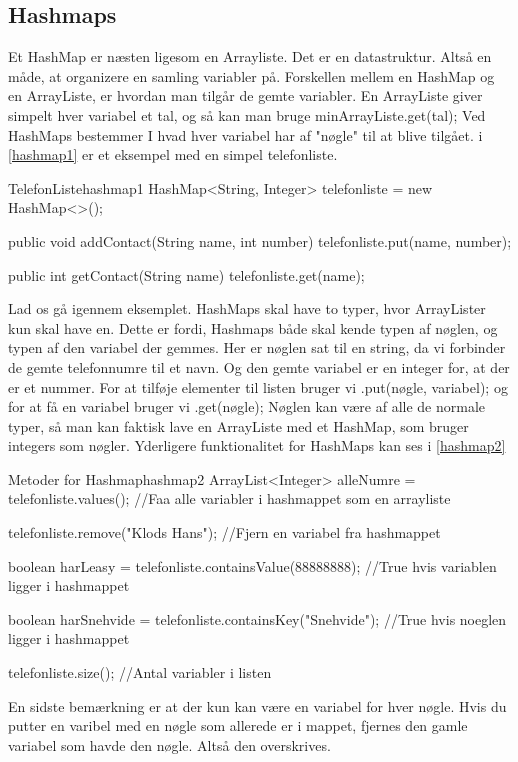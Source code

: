 \subsection{Hashmaps}
Et HashMap er næsten ligesom en Arrayliste. Det er en datastruktur. Altså en måde, at organizere en samling variabler på. Forskellen mellem en HashMap og en ArrayListe, er hvordan man tilgår de gemte variabler. En ArrayListe giver simpelt hver variabel et tal, og så kan man bruge minArrayListe.get(tal); Ved HashMaps bestemmer I hvad hver variabel har af "nøgle" til at blive tilgået. i \autoref{hashmap1} er et eksempel med en simpel telefonliste.
\begin{JavaCode}{TelefonListe}{hashmap1}
	HashMap<String, Integer> telefonliste = new HashMap<>();
	
	public void addContact(String name, int number){
		telefonliste.put(name, number);
	}
	
	public int getContact(String name){
		telefonliste.get(name);	
	}
\end{JavaCode}
Lad os gå igennem eksemplet. HashMaps skal have to typer, hvor ArrayLister kun skal have en. Dette er fordi, Hashmaps både skal kende typen af nøglen, og typen af den variabel der gemmes. Her er nøglen sat til en string, da vi forbinder de gemte telefonnumre til et navn. Og den gemte variabel er en integer for, at  der er et nummer.  For at tilføje elementer til listen bruger vi .put(nøgle, variabel); og for at få en variabel bruger vi .get(nøgle); Nøglen kan være af alle de normale typer, så man kan faktisk lave en ArrayListe med et HashMap, som bruger integers som nøgler. Yderligere funktionalitet for HashMaps kan ses i \autoref{hashmap2}
\begin{JavaCode}{Metoder for Hashmap}{hashmap2}
	ArrayList<Integer> alleNumre = telefonliste.values();
	//Faa alle variabler i hashmappet som en arrayliste
	
	telefonliste.remove("Klods Hans");
	//Fjern en variabel fra hashmappet
	
	boolean harLeasy = telefonliste.containsValue(88888888);
	//True hvis variablen ligger i hashmappet
	
	boolean harSnehvide = telefonliste.containsKey("Snehvide");
	//True hvis noeglen ligger i hashmappet
	
	telefonliste.size();
	//Antal variabler i listen
\end{JavaCode}
En sidste bemærkning er at der kun kan være en variabel for hver nøgle. Hvis du putter en varibel med en nøgle som allerede er i mappet, fjernes den gamle variabel som havde den nøgle. Altså den overskrives.

